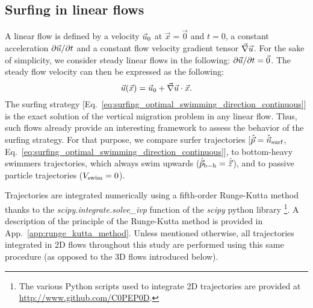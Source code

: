 \subsection{Surfing in linear flows}\label{sec:the_surfing_strategy_linear}

A linear flow is defined by a velocity $\vec{u}_0$ at $\vec{x} = \vec{0}$ and $t = 0$, a constant acceleration $\partial \vec{u} / \partial t$ and a constant flow velocity gradient tensor $\vec{\nabla} \vec{u}$.
For the sake of simplicity, we consider steady linear flows in the following: $\partial \vec{u} / \partial t = \vec{0}$.
The steady flow velocity can then be expressed as the following:
\begin{equation}\label{eq:linear_velocity}
	\vec{u}(\vec{x}) = \vec{u}_0 + \vec{\nabla} \vec{u} \cdot \vec{x}.
\end{equation}
The surfing strategy [Eq.~\eqref{eq:surfing_optimal_swimming_direction_continuous}] is the exact solution of the vertical migration problem in any linear flow.
Thus, such flows already provide an interesting framework to assess the behavior of the surfing strategy.
For that purpose, we compare surfer trajectories [$\hat{\vec{p}} = \hat{\vec{n}}_{\mathrm{surf}}$, Eq.~\eqref{eq:surfing_optimal_swimming_direction_continuous}], to bottom-heavy swimmers trajectories, which always swim upwards ($\hat{\vec{p}}_{\mathrm{b-h}} = \hat{\vec{z}}$), and to passive particle trajectories ($V_{\mathrm{swim}} = 0$).

Trajectories are integrated numerically using a fifth-order Runge-Kutta method \citep{dormand1980family} thanks to the \textit{scipy.integrate.solve_ivp} function of the \textit{scipy} python library \footnote{The various Python scripts used to integrate 2D trajectories are provided at \url{http://www.github.com/C0PEP0D}.}.
A description of the principle of the Runge-Kutta method is provided in App.~\ref{app:runge_kutta_method}.
Unless mentioned otherwise, all trajectories integrated in 2D flows throughout this study are performed using this same procedure (as opposed to the 3D flows introduced below).

